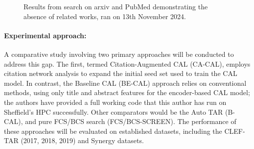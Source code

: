 \documentclass[10pt,oneside]{book}
\begin{document}
\begin{figure}[htbp]
    \centering
    \caption{Results from search on arxiv and PubMed demonstrating the absence of related works, ran on 13th November 2024.}
    \label{fig:search-results}
\end{figure}


\paragraph{Experimental approach: } A comparative study involving two primary approaches will be conducted to address this gap. The first, termed Citation-Augmented CAL (CA-CAL), employs citation network analysis to expand the initial seed set used to train the CAL model. In contrast, the Baseline CAL (BE-CAL) approach relies on conventional methods, using only title and abstract features for the encoder-based CAL model; the authors have provided a full working code that this author has run on Sheffield's HPC successfully. Other comparators would be the Auto TAR (B-CAL), and pure FCS/BCS search (FCS/BCS-SCREEN). The performance of these approaches will be evaluated on established datasets, including the CLEF-TAR (2017, 2018, 2019) and Synergy datasets.
\end{document}
